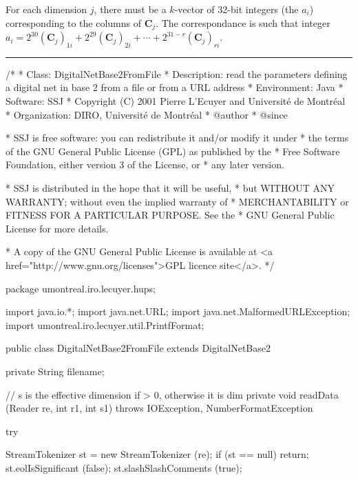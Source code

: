  For each dimension $j$, there must be a $k$-vector of 32-bit integers
 (the $a_i$) corresponding to the columns of $\mathbf{C}_j$. The 
  correspondance is such that integer
  $a_i = 2^{30}(\mathbf{C}_j)_{1i} + 2^{29}(\mathbf{C}_j)_{2i} +
   \cdots +    2^{31 - r}(\mathbf{C}_j)_{ri}$.


\bigskip\hrule\bigskip

\begin{code}
\begin{hide}
/*
 * Class:        DigitalNetBase2FromFile
 * Description:  read the parameters defining a digital net in base 2
                 from a file or from a URL address
 * Environment:  Java
 * Software:     SSJ 
 * Copyright (C) 2001  Pierre L'Ecuyer and Université de Montréal
 * Organization: DIRO, Université de Montréal
 * @author       
 * @since

 * SSJ is free software: you can redistribute it and/or modify it under
 * the terms of the GNU General Public License (GPL) as published by the
 * Free Software Foundation, either version 3 of the License, or
 * any later version.

 * SSJ is distributed in the hope that it will be useful,
 * but WITHOUT ANY WARRANTY; without even the implied warranty of
 * MERCHANTABILITY or FITNESS FOR A PARTICULAR PURPOSE.  See the
 * GNU General Public License for more details.

 * A copy of the GNU General Public License is available at
   <a href="http://www.gnu.org/licenses">GPL licence site</a>.
 */
\end{hide}
package umontreal.iro.lecuyer.hups;\begin{hide}

import java.io.*;
import java.net.URL;
import java.net.MalformedURLException;
import umontreal.iro.lecuyer.util.PrintfFormat;
\end{hide}

public class DigitalNetBase2FromFile extends DigitalNetBase2 \begin{hide} {
   private String filename;

   // s is the effective dimension if > 0, otherwise it is dim
   private void readData (Reader re, int r1, int s1)
       throws IOException, NumberFormatException
   {
      try {
         StreamTokenizer st = new StreamTokenizer (re);
         if (st == null) return;
         st.eolIsSignificant (false);
         st.slashSlashComments (true);

}}}
\end{hide}
\end{code}
